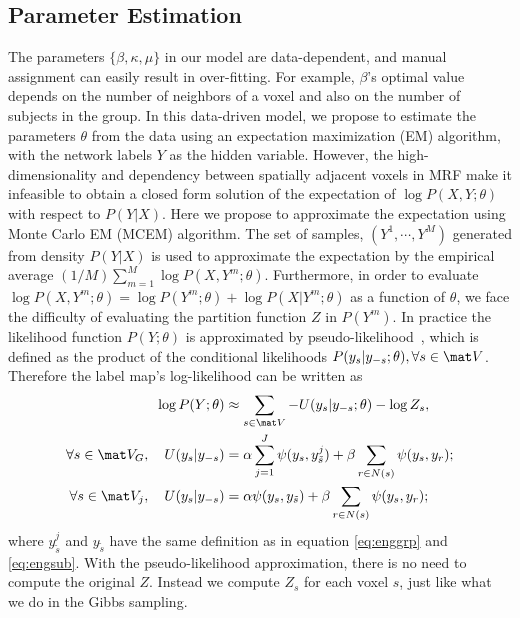 \documentclass[review,authoryear]{elsarticle}
\begin{document}
\subsection{Parameter Estimation}
The parameters $\{\beta, \kappa, \mu\}$ in our model are data-dependent, and
manual assignment can easily result in over-fitting. For example, $\beta$'s
optimal value depends on the number of neighbors of a voxel and also on the
number of subjects in the group. In this data-driven model, we propose to
estimate the parameters $\theta$ from the data using an
expectation maximization (EM) algorithm, with the network labels $Y$ as the
hidden variable.  However, the high-dimensionality and dependency between
spatially adjacent voxels in MRF make it infeasible to obtain a closed form
solution of the expectation of $\log P(X,Y;\theta)$ with respect to $P(Y|X)$. Here we
propose to approximate the expectation using Monte Carlo EM (MCEM)
algorithm. The set of samples, $(Y^1, \cdots, Y^M)$ generated from density
$P(Y|X)$ is used to approximate the expectation by the empirical average
$(1/M)\sum_{m=1}^M\log P (X, Y^m;\theta)$.  Furthermore, in order to evaluate
$\log P(X,Y^m;\theta) = \log P(Y^m;\theta) + \log P(X|Y^m;\theta)$ as a function
of $\theta$, we face the difficulty of evaluating the partition function $Z$ in
$P(Y^m)$.  In practice the likelihood function $P(Y; \theta)$ is approximated by
pseudo-likelihood~\citep{besag_spatial_1974}, which is defined as the product of
the conditional likelihoods $P(y_s|y_{-s}; \theta), \forall s
\in \mat V$. Therefore the label map's log-likelihood can be written as
\begin{align}
\log P(Y; \theta) &\approx \sum_{s\in\mat V} -U(y_s | y_{-s}; \theta) - \log
Z_s, \label{eq:pseudoll}\\
\forall s \in \mat V_G, \quad U(y_s|y_{-s}) &=  \alpha \sum_{j=1}^J \psi(y_s,y_{\tilde s}^j) +\beta\sum_{r\in N(s)} \psi(y_s, y_r); \nonumber\\
\forall s \in \mat V_j, \quad U(y_s|y_{-s}) &= \alpha \psi(y_s, y_{\tilde s}) + \beta \sum_{r\in N(s)} \psi(y_s, y_r); \nonumber
\end{align}
where $y_{\tilde s}^j$ and $y_{\tilde s}$ have the same definition as in equation
\eqref{eq:enggrp} and \eqref{eq:engsub}. With the pseudo-likelihood
approximation, there is no need to compute the original $Z$. Instead we compute
$Z_s$ for each voxel $s$, just like what we do in the Gibbs sampling. 
\end{document}
